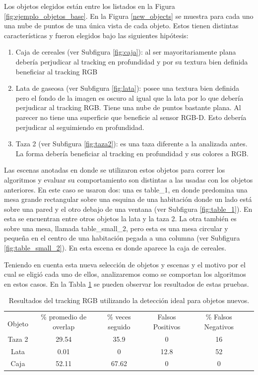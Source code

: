 Los objetos elegidos están entre los listados en la Figura \ref{fig:ejemplo_objetos_base}. En la Figura \ref{new_objects} se muestra para cada uno una nube de puntos de una única vista de cada objeto. Estos tienen distintas características y fueron elegidos bajo las siguientes hipótesis:
\begin{enumerate}
	\item Caja de cereales (ver Subfigura \ref{fig:caja}): al ser mayoritariamente plana debería perjudicar al tracking en profundidad y por su textura bien definida beneficiar al tracking RGB
	\item Lata de gaseosa (ver Subfigura \ref{fig:lata}): posee una textura bien definida pero el fondo de la imagen es oscuro al igual que la lata por lo que debería perjudicar al tracking RGB. Tiene una nube de puntos bastante plana. Al parecer no tiene una superficie que beneficie al sensor RGB-D. Esto debería perjudicar al seguimiendo en profundidad.
	\item Taza 2 (ver Subfigura \ref{fig:taza2}): es una taza diferente a la analizada antes. La forma debería beneficiar al tracking en profundidad y sus colores a RGB.
\end{enumerate}

Las escenas anotadas en donde se utilizaron estos objetos para correr los algoritmos y evaluar su comportamiento son distintas a las usadas con los objetos anteriores. En este caso se usaron dos: una es table\_1, en donde predomina una mesa grande rectangular sobre una esquina de una habitación donde un lado está sobre una pared y el otro debajo de una ventana (ver Subfigura \ref{fig:table_1}). En esta se encuentran entre otros objetos la lata y la taza 2. La otra también es sobre una mesa, llamada table\_small\_2, pero esta es una mesa circular y pequeña en el centro de una habitación pegada a una columna (ver Subfigura \ref{fig:table_small_2}). En esta escena es donde aparece la caja de cereales.


Teniendo en cuenta esta nueva selección de objetos y escenas y el motivo por el cual se eligió cada uno de ellos, analizaremos como se comportan los algoritmos en estos casos. En la Tabla \ref{tabla_rgb_nuevos} se pueden observar los resultados de estas pruebas.

\begin{table}[h]
	\centering
    \begin{tabular}{|c|c|c|c|c|c|}
    \hline
    & \multirow{2}{2.4cm}{\% promedio de overlap} & \multirow{2}{2cm}{\% veces seguido} & \multirow{2}{1.6cm}{Falsos Positivos} & \multirow{2}{1.6cm}{\% Falsos Negativos}\\
	Objeto & & & &\\
    \hline
    Taza 2  & 29.54      &  35.9     & 0        &  16 \\
    \hline
    Lata    &  0.01      &     0     & 12.8     &  52 \\
    \hline
    Caja    & 52.11      & 67.62     & 0        &   0 \\
    \hline
    \end{tabular}
\caption{Resultados del tracking RGB utilizando la detección ideal para objetos nuevos.}
\label{tabla_rgb_nuevos}
\end{table}

